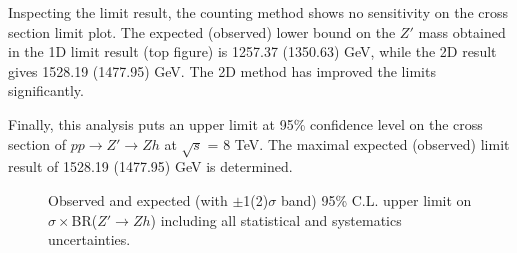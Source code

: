 Inspecting the limit result, the counting method shows no sensitivity on the cross section limit plot. The expected (observed) lower bound on the $Z'$ mass obtained in the 1D limit result (top figure) is 1257.37 (1350.63) GeV, while the 2D result gives 1528.19 (1477.95) GeV. The 2D method has improved the limits significantly.

Finally, this analysis puts an upper limit at 95\% confidence level on the cross section of $pp\rightarrow Z'\rightarrow Zh$ at $\sqrt{s}$ = 8 TeV. The maximal expected (observed) limit result of 1528.19 (1477.95) GeV is determined.

\begin{figure}[hbtp]
  \begin{center}
  \end{center}
  \caption{\label{fig:LimitResult} Observed and expected (with $\pm$1(2)$\sigma$ band) 95\% C.L. upper limit on $\sigma \times$BR($Z'\rightarrow Zh$) including all statistical and systematics uncertainties.}
\end{figure}


